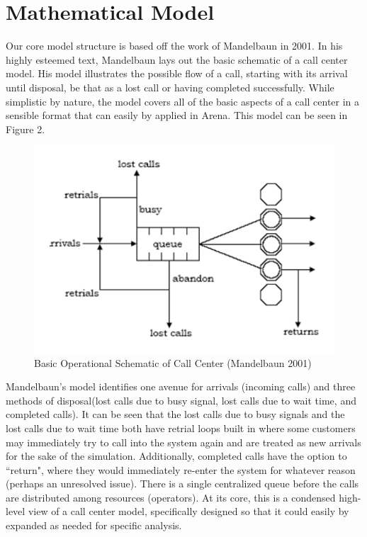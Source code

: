 \documentclass[12pt,twocolumn]{article}
\begin{document}
\section{Mathematical Model}

Our core model structure is based off the work of Mandelbaun in 2001\cite{mandelbaun}.  In his highly esteemed text, Mandelbaun lays out the basic schematic of a call center model.  His model illustrates the possible flow of a call, starting with its arrival until disposal, be that as a lost call or having completed successfully.  While simplistic by nature, the model covers all of the basic aspects of a call center in a sensible format that can easily by applied in Arena.  This model can be seen in Figure 2.  

	\begin{figure}[h]
	\includegraphics[scale=.45]{call_center_layout.png}
	\caption{Basic Operational Schematic of Call Center (Mandelbaun 2001)}
	\end{figure}

Mandelbaun's model identifies one avenue for arrivals (incoming calls) and three methods of disposal(lost calls due to busy signal, lost calls due to wait time, and completed calls).  It can be seen that the lost calls due to busy signals and the lost calls due to wait time both have retrial loops built in where some customers may immediately try to call into the system again and are treated as new arrivals for the sake of the simulation.  Additionally, completed calls have the option to ``return", where they would immediately re-enter the system for whatever reason (perhaps an unresolved issue).  There is a single centralized queue before the calls are distributed among resources (operators).  At its core, this is a condensed high-level view of a call center model, specifically designed so that it could easily by expanded as needed for specific analysis.
\end{document}
